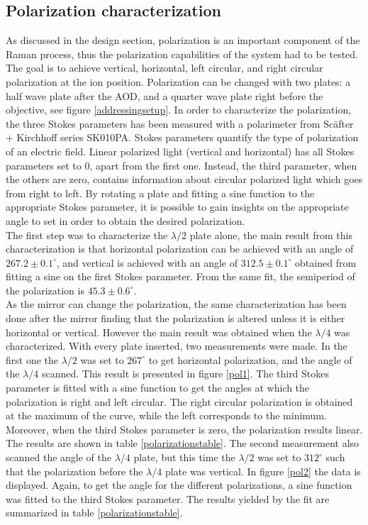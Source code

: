 \subsection{Polarization characterization}
As discussed in the design section, polarization is an important component of the Raman process, thus the polarization capabilities of the system had to be tested. The goal is to achieve vertical, horizontal, left circular, and right circular polarization at the ion position. Polarization can be changed with two plates: a half wave plate after the AOD, and a quarter wave plate right before the objective, see figure \ref{addressingsetup}. In order to characterize the polarization, the three Stokes parameters \cite{stokes} has been measured with a polarimeter from Sc\"after + Kirchhoff series SK010PA. Stokes parameters quantify the type of polarization of an electric field. Linear polarized light (vertical and horizontal) has all Stokes parameters set to 0, apart from the first one. Instead, the third parameter, when the others are zero, contains information about circular polarized light which goes from right to left. By rotating a plate and fitting a sine function to the appropriate Stokes parameter, it is possible to gain insights on the appropriate angle to set in order to obtain the desired polarization.\\
 The first step was to characterize the $\lambda/2$ plate alone, the main result from this characterization is that horizontal polarization can be achieved with an angle of $267.2\pm 0.1 ^{\circ}$, and vertical is achieved with an angle of $312.5\pm0.1^{\circ}$ obtained from fitting a sine on the first Stokes parameter. From the same fit, the semiperiod of the polarization is $45.3\pm 0.6^\circ$.\\
As the mirror can change the polarization, the same characterization has been done after the mirror finding that the polarization is altered unless it is either horizontal or vertical.
However the main result was obtained when the $\lambda/4$ was characterized. With every plate inserted, two measurements were made. In the first one the $\lambda/2$ was set to $267^\circ$ to get horizontal polarization, and the angle of the $\lambda/4$ scanned. This result is presented in figure \ref{pol1}. The third Stokes parameter is fitted with a sine function to get the angles at which the polarization is right and left circular. The right circular polarization is obtained at the maximum of the curve, while the left corresponds to the minimum. Moreover, when the third Stokes parameter is zero, the polarization results linear. The results are shown in table \ref{polarizationstable}.
The second measurement also scanned the angle of the $\lambda/4$ plate, but this time the $\lambda/2$ was set to $312^\circ$ such that the polarization before the $\lambda/4$ plate was vertical. In figure \ref{pol2} the data is displayed. Again, to get the angle for the different polarizations, a sine function was fitted to the third Stokes parameter. The results yielded by the fit are summarized in table \ref{polarizationstable}.


